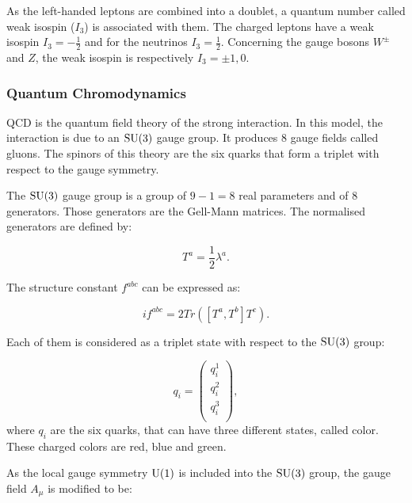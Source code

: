     As the left-handed leptons are combined into a doublet, a quantum number called weak isospin ($I_3$) is associated with them.
    The charged leptons have a weak isospin $I_3 = -\frac{1}{2}$ and for the neutrinos $I_3 = \frac{1}{2}$.
    Concerning the gauge bosons $W^{\pm}$ and $Z$, the weak isospin is respectively $I_3 = \pm 1, 0$.
    
    \subsubsection{Quantum Chromodynamics}
    
    \gls{QCD} is the quantum field theory of the strong interaction.
    In this model, the interaction is due to an $\rm{SU}(3)$ gauge group. 
    It produces 8 gauge fields called gluons.
    The spinors of this theory are the six quarks that form a triplet with respect to the gauge symmetry.

    The $\rm{SU}(3)$ gauge group is a group of $9 - 1 = 8$ real parameters and of 8 generators. 
    Those generators are the Gell-Mann matrices. 
    The normalised generators are defined by: 
    
    \begin{equation}
        T^a = \frac{1}{2}\lambda^a.
    \end{equation}

    The structure constant $f^{abc}$ can be expressed as:

    \begin{equation}
        if^{abc} = 2 Tr([T^a,T^b]T^c).
    \end{equation}
     
    Each of them is considered as a triplet state with respect to the $\rm{SU}(3)$ group:

    \begin{equation}
      q_i = 
        \begin{pmatrix}
          q_i^1 \\
          q_i^2 \\
          q_i^3 \\
        \end{pmatrix},
     \end{equation}
    where $q_i$ are the six quarks, that can have three different states, called color.
    These charged colors are red, blue and green.

    As the local gauge symmetry $\rm{U}(1)$ is included into the $\rm{SU}(3)$ group, the gauge field $A_{\mu}$ is modified to be:
    
